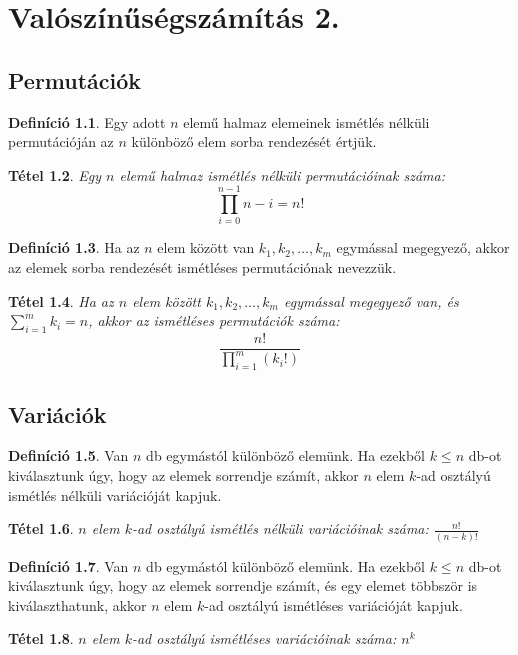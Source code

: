 \documentclass[twoside,12pt]{report}
\newtheorem{theorem}{Tétel}[section]
\theoremstyle{definition}
\newtheorem{definition}[theorem]{Definíció}
\begin{document}
\chapter{Valószínűségszámítás 2.}
\section{Permutációk}
	\begin{definition}
		Egy adott $n$ elemű halmaz elemeinek ismétlés nélküli permutációján az $n$ különböző elem sorba rendezését értjük.
	\end{definition}
	\begin{theorem}
		Egy $n$ elemű halmaz ismétlés nélküli permutációinak száma:
		\begin{equation*}
			\prod_{i=0}^{n-1}n-i=n!
		\end{equation*}
	\end{theorem}
	\begin{definition}
		Ha az $n$ elem között van $k_1,k_2,\dots,k_m$ egymással megegyező, akkor az elemek sorba rendezését ismétléses permutációnak nevezzük.
	\end{definition}
	\begin{theorem}
		Ha az $n$ elem között $k_1,k_2,\dots,k_m$ egymással megegyező van, és $\sum_{i=1}^{m}k_i=n$, akkor az ismétléses permutációk száma:
		\begin{equation*}
			\frac{n!}{\prod_{i=1}^{m}(k_i!)}
		\end{equation*}
	\end{theorem}
\section{Variációk}
	\begin{definition}
		Van $n$ db egymástól különböző elemünk. Ha ezekből $k\le n$ db-ot kiválasztunk úgy, hogy az elemek sorrendje számít, akkor $n$ elem $k$-ad osztályú ismétlés nélküli variációját kapjuk.
	\end{definition}
	\begin{theorem}
		$n$ elem $k$-ad osztályú ismétlés nélküli variációinak száma: $\frac{n!}{(n-k)!}$
	\end{theorem}
	\begin{definition}
		Van $n$ db egymástól különböző elemünk. Ha ezekből $k\le n$ db-ot kiválasztunk úgy, hogy az elemek sorrendje számít, és egy elemet többször is kiválaszthatunk, akkor $n$ elem $k$-ad osztályú ismétléses variációját kapjuk.
	\end{definition}
	\begin{theorem}
		$n$ elem $k$-ad osztályú ismétléses variációinak száma: $n^k$
	\end{theorem}
\end{document}
